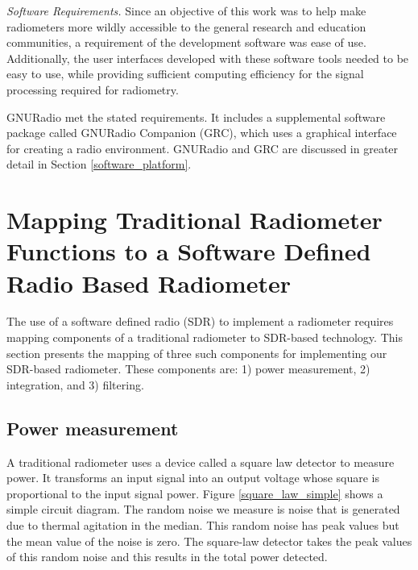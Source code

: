 \emph{Software Requirements.}  Since an objective of this work was to help make radiometers more wildly accessible to the general research and education communities, a requirement of the development software was ease of use.  Additionally, the user interfaces developed with these software tools needed to be easy to use, while providing sufficient computing efficiency for the signal processing required for radiometry.

GNURadio met the stated requirements.  It includes a supplemental software package called GNURadio Companion (GRC), which uses a graphical interface for creating a radio environment.  GNURadio and GRC are discussed in greater detail in Section \ref{software_platform}.


\section{Mapping Traditional Radiometer Functions to a Software Defined Radio Based Radiometer}

The use of a software defined radio (SDR) to implement a radiometer requires mapping components of a traditional radiometer to SDR-based technology.  This section presents the mapping of three such components for implementing our SDR-based radiometer.  These components are:  1) power measurement, 2) integration, and 3) filtering.

\subsection{Power measurement}

A traditional radiometer uses a device called a square law detector to measure power.  It transforms an input signal into an output voltage whose square is proportional to the input signal power.  Figure \ref{square_law_simple} shows a simple circuit diagram.  The random noise we measure is noise that is generated due to thermal agitation in the median.  This random noise has peak values but the mean value of the noise is zero.  The square-law detector takes the peak values of this random noise and this results in the total power detected.

